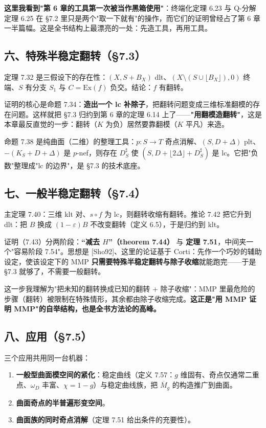 \textbf{这里我看到"第 6 章的工具第一次被当作黑箱使用"}：终端化定理 6.23 与 Q-分解定理 6.25 在 \S7.2 里只是两个"取一下就有"的操作，而它们的证明曾经占了第 6 章一半篇幅。这是全书结构上最漂亮的一处：先造工具，再用工具。

\subsection*{六、特殊半稳定翻转（\S7.3）}

定理 7.32 是三假设下的存在性：$(X,S+B_X)$ dlt、$(X\setminus(S\cup\lfloor B_X\rfloor),0)$ 终端、$S$ 有分支 $S_1$ 与 $C=\mathrm{Ex}(f)$ 负交。结论：$f$ 有翻转。

证明的核心是命题 7.34：\textbf{造出一个 lc 补除子}，把翻转问题变成三维标准翻模的存在问题。这样就把 \S7.3 归约到第 6 章的定理 6.14 上了——\textbf{"用翻模造翻转"}，这是本章最反直觉的一步：翻转（$K$ 为负）居然要靠翻模（$K$ 平凡）来造。

命题 7.38 是纯曲面（二维）的整理工具：$p:S\to T$ 奇点消解、$(S,D+\Delta)$ plt、$-(K_S+D+\Delta)$ 是 $p$-nef，则存在 $D^\sharp_S$ 使 $(S,D+\lfloor2\Delta\rfloor+D^\sharp_S)$ 是 lc。它把"负数"整理成"lc 的边界"，是 \S7.3 的技术底座。

\subsection*{七、一般半稳定翻转（\S7.4）}

主定理 7.40：三维 klt 对、$s\circ f$ 为 lc，则翻转收缩有翻转。推论 7.42 把它升到 dlt：把 $B$ 换成 $(1-\varepsilon)B$ 不改变翻转（定义 6.5），于是归约到 klt。

证明（7.43）分两阶段：\textbf{“减去 $H$”（theorem 7.44）} 与 \textbf{定理 7.51}，中间夹一个"容易阶段 7.54"。思想是 [Sho92]、这里的论证基于 Corti：先作一个巧妙的辅助设定，使该设定下的 MMP \textbf{只需要特殊半稳定翻转与除子收缩}就能跑完——于是 \S7.3 就够了，不需要一般翻转。

这一步我理解为"把未知的翻转换成已知的翻转 + 除子收缩"：MMP 里最危险的步骤（翻转）被限制在特殊情形，其余都由除子收缩完成。\textbf{这正是"用 MMP 证明 MMP"的自举结构，也是全书方法论的高峰。}

\subsection*{八、应用（\S7.5）}

三个应用共用同一台机器：

\begin{enumerate}
\item \textbf{一般型曲面模空间的紧化}：稳定曲线（定义 7.57：$g$ 维固有、奇点仅通常二重点、$\omega_D$ 丰富、$\chi=1-g$）与稳定曲线族，把 $\overline{M}_g$ 的构造推广到曲面。
\item \textbf{曲面奇点的半普遍形变空间}。
\item \textbf{曲面族的同时奇点消解}（定理 7.51 给出条件的充要性）。
\end{enumerate}

